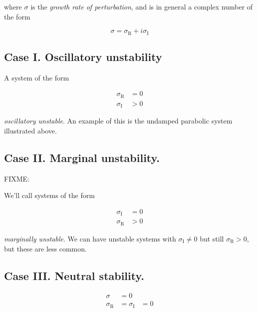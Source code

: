 where $\sigma$ is the \textit{growth rate of perturbation}, and is in general a complex number of the form

\begin{equation}\label{eqn:continuumL21:30}
\sigma = \sigma_\text{R} + i \sigma_\text{I}
\end{equation}

\subsection{Case I.  Oscillatory unstability}

A system of the form

\begin{align*}
\sigma_{\text{R}} &= 0 \\
\sigma_{\text{I}} &> 0
\end{align*}

\textit{oscillatory unstable}.  An example of this is the undamped parabolic system illustrated above.

\subsection{Case II.  Marginal unstability.}

FIXME:

We'll call systems of the form

\begin{align*}
\sigma_{\text{I}} &= 0 \\
\sigma_{\text{R}} &> 0
\end{align*}

\textit{marginally unstable}.  We can have unstable systems with $\sigma_{\text{I}} \ne 0$ but still $\sigma_{\text{R}} > 0$, but these are less common.

\subsection{Case III.  Neutral stability.}

\begin{align*}
\sigma &= 0 \\
\sigma_{\text{R}} &= \sigma_{\text{I}} &= 0
\end{align*}


